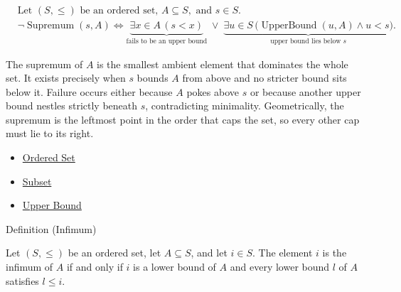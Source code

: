 \begin{remark*}
\[
\begin{aligned}
&\text{Let } (S,\le) \text{ be an ordered set, } A \subseteq S, \text{ and } s \in S.\\[2pt]
&\neg\operatorname{Supremum}(s,A) \Longleftrightarrow
\underbrace{\exists x \in A\,(s < x)}_{\text{fails to be an upper bound}}
\;\lor\;
\underbrace{\exists u \in S\,\bigl(\operatorname{UpperBound}(u,A) \land u < s\bigr)}_{\text{upper bound lies below } s}.
\end{aligned}
\]
\end{remark*}

\begin{remark*}[Interpretation]
The supremum of $A$ is the smallest ambient element that dominates the whole set. It exists precisely when $s$ bounds $A$ from above and no stricter bound sits below it. Failure occurs either because $A$ pokes above $s$ or because another upper bound nestles strictly beneath $s$, contradicting minimality. Geometrically, the supremum is the leftmost point in the order that caps the set, so every other cap must lie to its right.
\end{remark*}

\begin{dependencies}
\begin{itemize}
  \item \hyperref[def:ordered-set]{Ordered Set}
  \item \hyperref[def:subset]{Subset}
  \item \hyperref[def:upper-bound]{Upper Bound}
\end{itemize}
\end{dependencies}











\begin{definitionbox}{Definition (Infimum)}
\begin{definition}[Infimum]
\label{def:infimum}
Let $(S,\le)$ be an ordered set, let $A\subseteq S$, and let $i\in S$. The element $i$ is the infimum of $A$ if and only if $i$ is a lower bound of $A$ and every lower bound $l$ of $A$ satisfies $l\le i$.
\end{definition}
\end{definitionbox}

